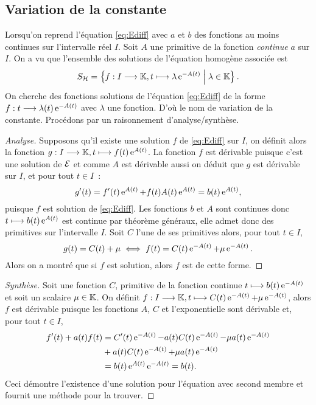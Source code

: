 \subsection{Variation de la constante}
\label{subsec:variationdelaconstante}

Lorsqu'on reprend l'équation \eqref{eq:Ediff} avec \(a\) et \(b\) des 
fonctions au moins continues sur l'intervalle réel \(I\). Soit \(A\) une 
primitive de la fonction \emph{continue} \(a\) sur \(I\). On a vu que 
l'ensemble des solutions de l'équation homogène associée est
\begin{equation}
    S_{\mathcal{H}} = \left\{f:I \longrightarrow \mathbb{K}, t \longmapsto \lambda \operatorname{e}^{-A(t)}\mathrel{}\middle|\mathrel{}\lambda \in 
    \mathbb{K}\right\}.
\end{equation}
On cherche des fonctions solutions de l'équation \eqref{eq:Ediff} de la 
forme \(f:t \longrightarrow \lambda(t)\operatorname{e}^{-A(t)}\) avec \(\lambda\) une 
fonction. D'où le nom de variation de la constante. Procédons par un 
raisonnement d'analyse/synthèse.

\begin{proof}[Analyse]
    Supposons qu'il existe une solution \(f\) de \eqref{eq:Ediff} sur \(I\), on 
    définit alors la fonction \(g:I \longrightarrow \mathbb{K}, t \longmapsto f(t)\operatorname{e}^{A(t)}\). La 
    fonction \(f\) est dérivable puisque c'est une solution de \(\mathcal{E}\) et comme 
    \(A\) est dérivable aussi on déduit que \(g\) est dérivable sur \(I\), et 
    pour tout \(t \in I\)~:
    \begin{equation}
        g'(t) = f'(t)\operatorname{e}^{A(t)} + f(t)A(t)\operatorname{e}^{A(t)} = b(t)\operatorname{e}^{A(t)},
    \end{equation}
    puisque \(f\) est solution de \eqref{eq:Ediff}. Les fonctions \(b\) et \(A\) 
    sont continues donc \(t \longmapsto b(t)\operatorname{e}^{A(t)}\) est continue par 
    théorème généraux, elle admet donc des primitives sur l'intervalle \(I\). 
    Soit \(C\) l'une de ses primitives alors, pour tout \(t \in I\), 
    \begin{equation}
        g(t) = C(t) + \mu \iff f(t) = C(t)\operatorname{e}^{-A(t)} + \mu \operatorname{e}^{-A(t)}.
    \end{equation}
    Alors on a montré que si \(f\) est solution, alors \(f\) est de cette forme.
\end{proof}

\begin{proof}[Synthèse] 
    Soit une fonction \(C\), primitive de la fonction continue \(t \longmapsto 
    b(t)\operatorname{e}^{-A(t)}\) et soit un scalaire \(\mu \in \mathbb{K}\). On définit 
    \(f:I \longrightarrow \mathbb{K}, t \longmapsto C(t)\operatorname{e}^{-A(t)} + \mu \operatorname{e}^{-A(t)}\), alors \(f\) est 
    dérivable puisque les fonctions \(A\), \(C\) et l'exponentielle sont 
    dérivable et, pour tout \(t \in I\),
    \begin{align}
        f'(t) + a(t)f(t)& = C'(t) \operatorname{e}^{-A(t)} -a(t)C(t)\operatorname{e}^{-A(t)}-\mu a(t) \operatorname{e}^{-A(t)} 
        \notag \\ 
                      &+ a(t)C(t)\operatorname{e}^{-A(t)} + \mu a(t) \operatorname{e}^{-A(t)}\\
                      &= b(t) \operatorname{e}^{A(t)} \operatorname{e}^{-A(t)} = b(t).
    \end{align}
    Ceci démontre l'existence d'une solution pour l'équation avec second membre 
    et fournit une méthode pour la trouver.
\end{proof}

